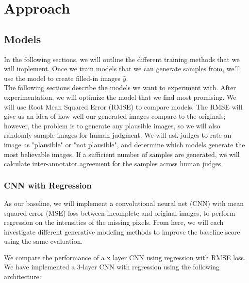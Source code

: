 \documentclass[10pt,twocolumn,letterpaper]{article}
\begin{document}
\section{Approach}

\subsection{Models}
In the following sections, we will outline the different training methods that we will implement. Once we train models that we can generate samples from, we'll use the model to create filled-in images $\hat{y}$. \\

The following sections describe the models we want to experiment with. After experimentation, we will optimize the model that we find most promising. We will use Root Mean Squared Error (RMSE) to compare models. The RMSE will give us an idea of how well our generated images compare to the originals; however, the problem is to generate any plausible images, so we will also randomly sample images for human judgment. We will ask judges to rate an image as "plausible" or "not plausible", and determine which models generate the most believable images. If a sufficient number of samples are generated, we will calculate inter-annotator agreement for the samples across human judges. 

\subsubsection{CNN with Regression}
\par As our baseline, we will implement a convolutional neural net (CNN) with mean squared error (MSE) loss between incomplete and original images, to perform regression on the intensities of the missing pixels. From here, we will each investigate different generative modeling methods to improve the baseline score using the same evaluation.


We compare the performance of a x layer CNN using regression with RMSE loss.
We have implemented a 3-layer CNN with regression using the following architecture: 
\end{document}
